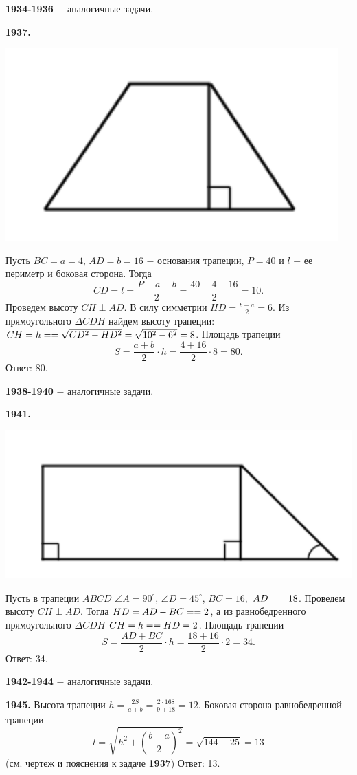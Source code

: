 \textbf{1934-1936} $-$ аналогичные задачи.

\textbf{1937.}

{\centering \includegraphics[width=0.45\linewidth]{Geometry/Content/28.png}
	
}

Пусть $BC = a = 4$, $AD = b = 16$ $-$ основания трапеции, $P=40$ и $l$ $-$ ее периметр и боковая сторона. Тогда
\[
CD = l = \frac{P-a-b}{2} = \frac{40-4-16}{2} = 10.
\]
Проведем высоту $CH \perp AD$. В силу симметрии $HD = \frac{b - a}{2} = 6$. Из прямоугольного $\Delta CDH$ найдем высоту трапеции: $CH = h =\linebreak= \sqrt{CD^2-HD^2} = \sqrt{10^2-6^2} = 8$. Площадь трапеции
\[
S = \frac{a+b}{2}\cdot h = \frac{4 + 16}{2} \cdot 8 = 80.
\] \null \hspace*{\fill} Ответ: 80.

\textbf{1938-1940} $-$ аналогичные задачи.

\textbf{1941.}

{\centering \includegraphics[width=0.45\linewidth]{Geometry/Content/29.png}
	
}

Пусть в трапеции $ABCD$ $\angle A = 90^\circ$, $\angle D = 45^\circ$, $BC = 16,$ $AD = \linebreak=18$. Проведем высоту $CH \perp AD$. Тогда $HD = AD - BC = \linebreak = 2$, а из равнобедренного прямоугольного $\Delta CDH$ $CH = h = \linebreak = HD = 2$. Площадь трапеции
\[
S = \frac{AD + BC}{2}\cdot h = \frac{18+16}{2}\cdot2=34.
\] \null \hspace*{\fill} Ответ: 34.

\textbf{1942-1944} $-$ аналогичные задачи.

\textbf{1945.} Высота трапеции $h = \frac{2S}{a+b} = \frac{2 \cdot 168}{9+18} = 12$. Боковая сторона равнобедренной трапеции
\[
l = \sqrt{h^2+\left( \frac{b-a}{2} \right)^2} = \sqrt{144 + 25} =13
\]  (см. чертеж и пояснения к задаче \textbf{1937})\newline \null \hspace*{\fill} Ответ: 13.

